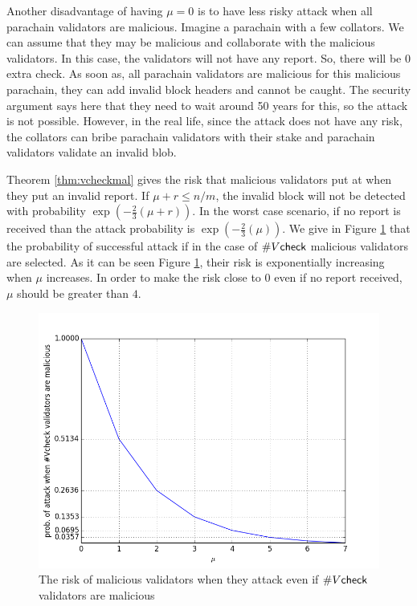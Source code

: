 Another disadvantage of having $\mu = 0$ is to have less risky attack  when all parachain validators are malicious. Imagine a parachain with a few collators. We can assume that they may be malicious and collaborate with the malicious validators. In this case, the validators will not have any report. So, there will be 0 extra check. As soon as, all parachain validators are malicious for this malicious parachain, they can add invalid block headers and cannot be caught. The security argument says here that they need to wait around 50 years for this, so the attack is not possible. However, in the real life, since the attack does not have any risk, the collators can bribe parachain validators with their stake and parachain validators validate an invalid blob.


Theorem \ref{thm:vcheckmal} gives the risk that  malicious validators put at  when they put an invalid report.  If $\mu + r \leq n/m$, the invalid block will not be detected with probability $\exp(-\frac{2}{3}(\mu+r))$. In the worst case scenario, if no report is received than the attack probability is $\exp(-\frac{2}{3}(\mu))$. We give in Figure \ref{fig:mu} that the probability of successful attack if in the case of $\#V\mathsf{check}$ malicious validators are selected. As it can be seen Figure \ref{fig:mu}, their risk is exponentially increasing when $\mu$ increases. In order to make the risk close to 0 even if no report received, $\mu$ should be greater than $4$.

\begin{figure}[h]\centering
	  \includegraphics[width=12cm]{images/muval.png}
	  \caption{The risk of malicious validators when they attack even if $\#V\mathsf{check}$ validators are malicious}
	  \label{fig:mu}
\end{figure}

